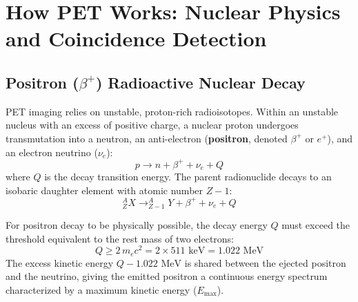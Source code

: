 \documentclass[11pt,a4paper]{article}
\begin{document}
\section{How PET Works: Nuclear Physics and Coincidence Detection}

\subsection{Positron ($\beta^+$) Radioactive Nuclear Decay}
PET imaging relies on unstable, proton-rich radioisotopes. Within an unstable nucleus with an excess of positive charge, a nuclear proton undergoes transmutation into a neutron, an anti-electron (\textbf{positron}, denoted $\beta^+$ or $e^+$), and an electron neutrino ($\nu_e$):
\begin{equation}
    p \to n + \beta^+ + \nu_e + Q
\end{equation}
where $Q$ is the decay transition energy. The parent radionuclide decays to an isobaric daughter element with atomic number $Z-1$:
\begin{equation}
    ^{A}_{Z}X \to ^{A}_{Z-1}Y + \beta^+ + \nu_e + Q
\end{equation}

For positron decay to be physically possible, the decay energy $Q$ must exceed the threshold equivalent to the rest mass of two electrons:
\begin{equation}
    Q \ge 2 \, m_e c^2 = 2 \times 511\text{ keV} = 1.022\text{ MeV}
\end{equation}
The excess kinetic energy $Q - 1.022\text{ MeV}$ is shared between the ejected positron and the neutrino, giving the emitted positron a continuous energy spectrum characterized by a maximum kinetic energy ($E_{\max}$).
\end{document}
